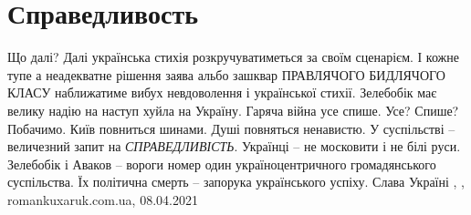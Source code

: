  
 
 
 
 
\chapter{Справедливость}

Що далі? Далі українська стихія розкручуватиметься за своїм сценарієм.  І
кожне тупе а неадекватне рішення заява альбо зашквар ПРАВЛЯЧОГО БИДЛЯЧОГО КЛАСУ
наближатиме вибух невдоволення і української стихії.  Зелебобік має велику
надію на наступ хуйла на Україну.  Гаряча війна усе спише.  Усе?  Спише?
Побачимо.  Київ повниться шинами.  Душі повняться ненавистю.  У суспільстві --
величезний запит на \emph{СПРАВЕДЛИВІСТЬ}.  Українці -- не московити і не білі руси.
Зелебобік і Аваков -- вороги номер один україноцентричного громадянського
суспільства. Їх політична смерть -- запорука українського успіху.  Слава
Україні
, , romankuxaruk.com.ua, 08.04.2021

